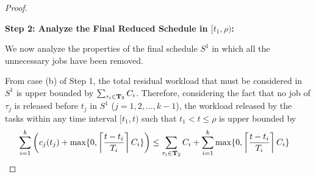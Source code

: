 \begin{proof}
\begin{enumerate}[(a)]
\end{enumerate}
 

{\bf Step 2: Analyze the Final Reduced Schedule in $[t_1, \rho)$:}


We now analyze the properties of the final schedule $S^1$ in which all the unnecessary jobs have been removed.   

From case (b) of Step 1, the total residual workload that must be considered in $S^1$ is upper bounded by $\sum_{\tau_i \in {\bf T}_2} C_i$.
Therefore, considering the fact that no job of $\tau_j$ is released before $t_j$ in $S^1$ ($j=1,2,\ldots,k-1$), the workload released by the tasks within any time interval $[t_1, t)$ such that $t_1 < t \leq \rho$ is upper bounded by 
\begin{align*}
\sum_{i=1}^k \left( c_j(t_j) + \max\{0, \left\lceil{\frac{t- t_i}{T_i} }\right\rceil C_i \} \right) & \leq \sum_{\tau_i \in {\bf T}_2} C_i + \sum_{i=1}^k \max\{0, \left\lceil{\frac{t- t_i}{T_i} }\right\rceil C_i \}
\end{align*}


\end{proof}
